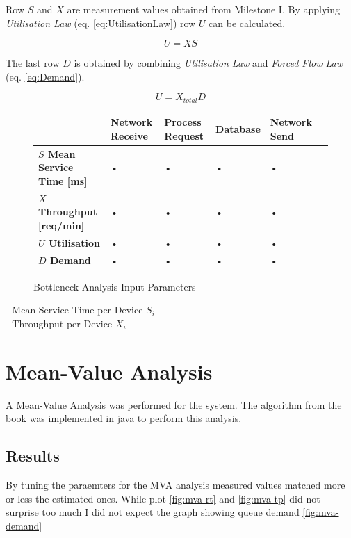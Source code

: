 \documentclass[a4paper]{article}
\begin{document}
Row $S$ and $X$ are measurement values obtained from Milestone I. By applying \textit{Utilisation Law} (eq. \ref{eq:UtilisationLaw}) row $U$ can be calculated.   

\begin{equation}
\label{eq:UtilisationLaw}
U = X S
\end{equation}


The last row $D$ is obtained by combining \textit{Utilisation Law} and \textit{Forced Flow Law} (eq. \ref{eq:Demand}). 

\begin{equation}
\label{eq:Demand}
U = X_{total} D
\end{equation}


\begin{figure}[H]
\label{tabular:BottleneckParams}
\begin{center}
\begin{tabular}{|l|l|l|l|l|l|}
\hline 
 & \textbf{Network Receive} & \textbf{Process Request} & \textbf{Database} & \textbf{Network Send}\\ 
\hline
\textbf{$S$ Mean Service Time [ms]} & • & • & • & • \\
\hline 
\textbf{$X$ Throughput [req/min]} & • & • & • & • \\
\hline
\textbf{$U$ Utilisation} & • & • & • & • \\
\hline
\textbf{$D$ Demand} & • & • & • & • \\
\hline
\end{tabular} 
\caption{Bottleneck Analysis Input Parameters}
\end{center}
\end{figure}


- Mean Service Time per Device $S_i$\\
- Throughput per Device $X_i$


\section{Mean-Value Analysis}

A Mean-Value Analysis was performed for the system. The algorithm from the book \cite[Box 31.2]{Raj} was implemented in java to perform this analysis.

\subsection{Results}
By tuning the paraemters for the MVA analysis measured values matched more or less the estimated ones. While plot \ref{fig:mva-rt} and \ref{fig:mva-tp} did not surprise too much I did not expect the graph showing queue demand \ref{fig:mva-demand}
\end{document}
